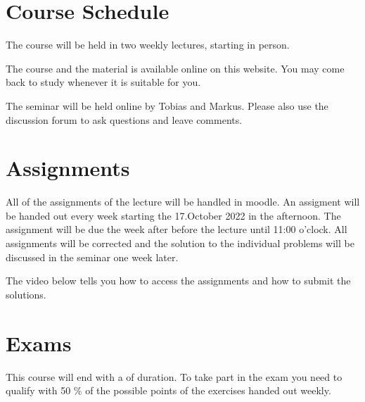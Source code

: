\documentclass[letterpaper,10pt,english]{sphinxmanual}
\begin{document}
\chapter{Course Schedule}
\label{\detokenize{course-info/schedule:course-schedule}}\label{\detokenize{course-info/schedule::doc}}
\sphinxAtStartPar
The course will be held in two weekly lectures, starting  in person.

\begin{DUlineblock}{0em}
\item[] 
\item[] 
\end{DUlineblock}

\sphinxAtStartPar
The course and the material is available online on this website. You may come back to study whenever it is suitable for you.

\sphinxAtStartPar
The seminar will be held online by Tobias and Markus. Please also use the discussion forum to ask questions and leave comments.


\chapter{Assignments}
\label{\detokenize{course-info/assignments:assignments}}\label{\detokenize{course-info/assignments::doc}}
\sphinxAtStartPar
All of the assignments of the lecture will be handled in moodle. An assigment will be handed out every week starting the 17.October 2022 in the afternoon. The assignment will be due the week after before the lecture until 11:00 o’clock. All assignments will be corrected and the solution to the individual problems will be discussed in the seminar one week later.

\sphinxAtStartPar
{}

\sphinxAtStartPar
The video below tells you how to access the assignments and how to submit the solutions.




\chapter{Exams}
\label{\detokenize{course-info/exam:exams}}\label{\detokenize{course-info/exam::doc}}
\sphinxAtStartPar
This course will end with a  of  duration. To take part in the exam you need to qualify with 50 \% of the possible points of the exercises handed out weekly.
\end{document}
